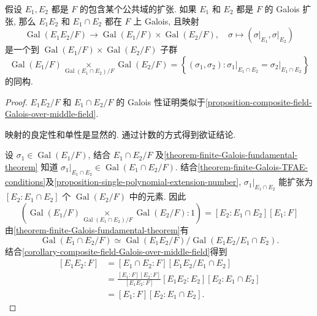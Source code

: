 \begin{proposition}
  假设 \( E_1, E_2 \) 都是 \( F \) 的包含某个公共域的扩张.
  如果 \( E_1 \) 和 \( E_2 \) 都是 \( F \) 的 Galois 扩张, 那么 \( E_1 E_2 \) 和
  \( E_1 \cap E_2 \) 都在 \( F \) 上 Galois, 且映射
  \[
    \operatorname{Gal}(E_1E_2/F) \to \operatorname{Gal}(E_1/F) \times
    \operatorname{Gal}(E_2/F),\quad \sigma \mapsto
    (\left.\sigma\right\vert_{E_1}, \left.\sigma\right\vert_{E_2})
  \]
  是一个到 \( \operatorname{Gal}(E_1/F) \times \operatorname{Gal}(E_2/F) \)
  子群
  \[
    \operatorname{Gal}(E_1/F) \mathop{\times}\limits_{\operatorname{Gal}(E_1
      \cap E_2) / F} \operatorname{Gal}(E_2/F) = \left\lbrace (\sigma_1,
        \sigma_2): \left.\sigma_1\right\vert_{E_1 \cap E_2} =
          \left.\sigma_2\right\vert_{E_1 \cap E_2} \right\rbrace
  \]
  的同构.
\end{proposition}
\begin{proof}
  \( E_1E_2/F \) 和 \( E_1 \cap E_2/F \) 的 Galois
  性证明类似于\cref{proposition-composite-field-Galois-over-middle-field}.

  映射的良定性和单性是显然的.
  通过计数的方式得到欲证结论.

  设 \( \sigma_1 \in \operatorname{Gal}(E_1/F) \), 结合 \( E_1 \cap E_2 / F \)
  及\cref{theorem-finite-Galois-fundamental-theorem} 知道 \( \left. \sigma_1
    \right\vert_{E_1 \cap E_2} \in \operatorname{Gal}(E_1 \cap E_2/ F) \).
  结合\cref{theorem-finite-Galois-TFAE-conditions}及\cref{proposition-single-polynomial-extension-number},
  \( \left. \sigma_1 \right\vert_{E_1 \cap E_2} \) 能扩张为 \( [E_2: E_1 \cap
    E_2] \) 个 \( \operatorname{Gal}(E_2/F) \) 中的元素.
  因此
  \[
    (\operatorname{Gal}(E_1/F) \mathop{\times}\limits_{\operatorname{Gal}(E_1
    \cap E_2) / F} \operatorname{Gal}(E_2/F):1) = [E_2: E_1 \cap E_2] [E_1:F]
  \]
  由\cref{theorem-finite-Galois-fundamental-theorem}有
  \[
    \operatorname{Gal}(E_1 \cap E_2 / F) \simeq
    \operatorname{Gal}(E_1E_2/F)/\operatorname{Gal}(E_1E_2/E_1 \cap E_2).
  \]
  结合\cref{corollary-composite-field-Galois-over-middle-field}得到
  \[
    \begin{split}
      [E_1E_2: F] &= [E_1 \cap E_2: F][E_1E_2/E_1 \cap E_2]\\
                  &=\frac{[E_1:F][E_2:F]}{[E_1E_2:F]}[E_1E_2:E_2][E_2:E_1
                  \cap E_2]\\
                  &= [E_1:F][E_2: E_1 \cap E_2].
    \end{split}
  \]
\end{proof}


